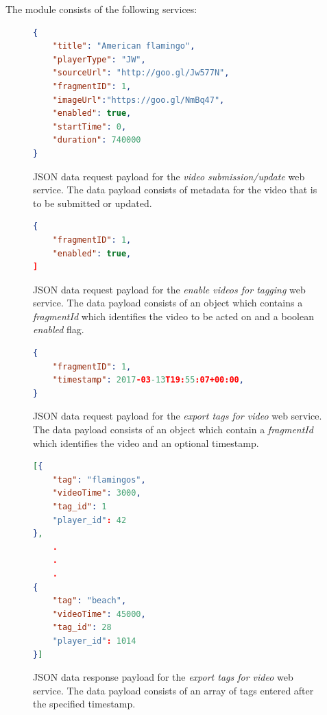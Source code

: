 The module consists of the following services:

\begin{figure}
\centering
\begin{lstlisting}[language=json,firstnumber=1]
{
	"title": "American flamingo",
	"playerType": "JW",
	"sourceUrl": "http://goo.gl/Jw577N",
	"fragmentID": 1,
	"imageUrl":"https://goo.gl/NmBq47",
	"enabled": true,
	"startTime": 0,
	"duration": 740000
}
\end{lstlisting}
\caption{JSON data request payload for the \textit{video submission/update} web service. The data payload consists of metadata for the video that is to be submitted or updated.}
\label{chap:waisda:add-update-json}
\end{figure}


\begin{figure}
\centering
\begin{lstlisting}[language=json,firstnumber=1]
{
	"fragmentID": 1,
	"enabled": true,
]
\end{lstlisting}
\caption{JSON data request payload for the \textit{enable videos for tagging} web service. The data payload consists of an object which contains a \textit{fragmentId} which identifies the video to be acted on and a boolean \textit{enabled} flag.}
\label{chap:waisda:enable-json}
\end{figure}

\begin{figure}
\centering
\begin{lstlisting}[language=json,firstnumber=1]
{
	"fragmentID": 1,
	"timestamp": 2017-03-13T19:55:07+00:00,
}
\end{lstlisting}
\caption{JSON data request payload for the \textit{export tags for video} web service. The data payload consists of an object which contain a \textit{fragmentId} which identifies the video and an optional timestamp.}
\label{chap:waisda:export-json}
\end{figure}

\begin{figure}
\centering
\begin{lstlisting}[language=json,firstnumber=1]
[{
	"tag": "flamingos",
	"videoTime": 3000,
	"tag_id": 1
	"player_id": 42
},
	.
	.
	.
{
	"tag": "beach",
	"videoTime": 45000,
	"tag_id": 28
	"player_id": 1014
}]
\end{lstlisting}
\caption{JSON data response payload for the \textit{export tags for video} web service. The data payload consists of an array of tags entered after the specified timestamp.}
\label{chap:waisda:export-json-result}
\end{figure}

